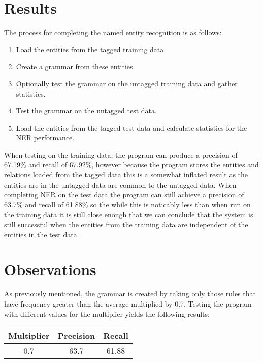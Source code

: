 \documentclass[draft]{article}
\begin{document}
\begin{multicols*}{2}
\section*{Results}
The process for completing the named entity recognition is as follows:
\begin{enumerate}
\item Load the entities from the tagged training data.
\item Create a grammar from these entities.
\item Optionally test the grammar on the untagged training data and gather statistics.
\item Test the grammar on the untagged test data.
\item Load the entities from the tagged test data and calculate statistics for the NER performance.
\end{enumerate}
When testing on the training data, the program can produce a precision of 67.19\% and recall of 67.92\%, however because the program stores the entities and relations loaded from the tagged data this is a somewhat inflated result as the entities are in the untagged data are common to the untagged data. When completing NER on the test data the program can still achieve a precision of 63.7\% and recall of 61.88\% so the while this is noticably less than when run on the training data it is still close enough that we can conclude that the system is still successful when the entities from the training data are independent of the entities in the test data.

\section*{Observations}
As previously mentioned, the grammar is created by taking only those rules that have frequency greater than the average multiplied by 0.7. Testing the program with different values for the multiplier yields the following results:

\begin{center}
	
\begin{tabular}{| c || c | c |}
\hline
Multiplier & Precision & Recall \\
\hline
0.7 & 63.7 & 61.88 \\

\hline
\end{tabular}


\end{center}





\end{multicols*}
\end{document}
